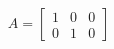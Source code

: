 \documentclass[preview]{standalone}
\begin{document}
\begin{align*}
A = \begin{bmatrix} 1 & 0 & 0 \\ 0 & 1 & 0 \end{bmatrix}
\end{align*}
\end{document}
